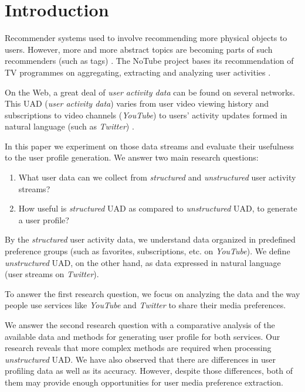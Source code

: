 \section{Introduction}

Recommender systems used to involve recommending more physical objects \cite{combining-cf-with-pa} to users.
However, more and more abstract topics are becoming parts of such recommenders (such as tags) \cite{accuracy-recommending}. The NoTube project bases its recommendation of TV programmes on aggregating,
extracting and analyzing user activities \cite{notube-main}.

On the Web, a great deal of \textit{user activity data} can be found on several networks. This UAD (\textit{user activity data}) varies from user video viewing history and subscriptions to video channels (\eg \textit{YouTube}) to users' activity updates formed in natural language (such as \textit{Twitter}) \cite{why-we-twitter}.

In this paper we experiment on those data streams and evaluate their usefulness to the user profile generation. We answer
two main research questions:
\begin{enumerate}
  \item What user data can we collect from \textit{structured} and \textit{unstructured} user activity streams?
  \item How useful is \textit{structured} UAD as compared to \textit{unstructured} UAD, to generate a user profile?
\end{enumerate}

By the \textit{structured} user activity data, we understand data organized in predefined
preference groups (such as favorites, subscriptions, etc. on \textit{YouTube}).
We define \textit{unstructured} UAD, on the other hand, as data expressed in natural language
(user streams on \textit{Twitter}).

To answer the first research question, we focus on analyzing the
data and the way people use services like \textit{YouTube} and \textit{Twitter} to share
their media preferences.

We answer the second research question with a comparative analysis of the available data and
methods for generating user profile for both services.
Our research reveals that more complex methods are required when processing \textit{unstructured} UAD.
We have also observed that there are differences in user profiling data as well as its
accuracy. However, despite those differences, both of them may provide
enough opportunities for user media preference extraction.

